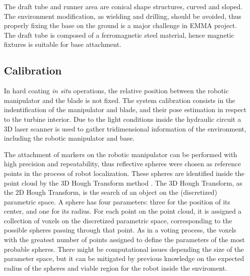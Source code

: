 The draft tube and runner area are conical shape structures, curved and
sloped. The environment modification, as wielding and drilling, should be
avoided, thus properly fixing the base on the ground is a major challenge in
EMMA project. The draft tube is composed of a ferromagnetic steel material,
hence magnetic fixtures is suitable for base attachment. 

\subsection{Calibration}
 
In hard coating \textit{in situ} operations, the relative position between the
robotic manipulator and the blade is not fixed. The system calibration consists
in the indentification of the manipulator and blade, and their pose estimation
in respect to the turbine interior. Due to the light conditions inside the
hydraulic circuit a 3D laser scanner is used to gather tridimensional
information of the environment, including the robotic manipulator and base. 

   
The attachment of markers on the robotic manipulator can be performed with high
precision and repeatability, thus reflective spheres were chosen as reference
points in the process of robot localization. These spheres are identified inside
the point cloud by the 3D Hough Transform method \cite{camurri20143d}. The 3D
Hough Transform, as the 2D Hough Transform, is the search of an object on the
(discretized) parametric space. A sphere has four parameters: three for the
position of its center, and one for its radius. For each point on the point
cloud, it is assigned a collection of voxels on the discretized parametric
space, corresponding to the possible spheres passing through that point. As in
a voting process, the voxels with the greatest number of points assigned to
define the parameters of the most probable spheres. There might be computational
issues depending the size of the parameter space, but it can be mitigated by
previous knowledge on the expected radius of the spheres and viable region for
the robot inside the enviroment.

